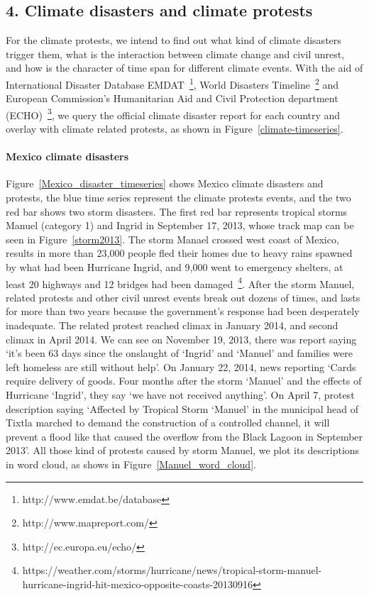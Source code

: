 \documentclass[9pt,twocolumn,twoside]{pnas-new}
\begin{document}
\subsection{4. Climate disasters and climate protests}
For the climate protests, we intend to find out what kind of climate disasters trigger them, what is the interaction between climate change and civil unrest, and how is the character of time span for different climate events. With the aid of International Disaster Database EMDAT~\footnote{http://www.emdat.be/database}, World Disasters Timeline~\footnote{http://www.mapreport.com/} and European Commission's Humanitarian Aid and Civil Protection department (ECHO)~\footnote{http://ec.europa.eu/echo/}, we query the official climate disaster report for each country and overlay with climate related protests, as shown in Figure~\ref{climate-timeseries}.


\paragraph{Mexico climate disasters}
Figure~\ref{Mexico_disaster_timeseries} shows Mexico climate disasters and protests, the blue time series represent the climate protests events, and the two red bar shows two storm disasters. The first red bar represents tropical storms Manuel (category 1) and Ingrid in September 17, 2013, whose track map can be seen in Figure~\ref{storm2013}. The storm Manael crossed west coast of Mexico, results in more than 23,000 people fled their homes due to heavy rains spawned by what had been Hurricane Ingrid, and 9,000 went to emergency shelters, at least 20 highways and 12 bridges had been damaged~\footnote{https://weather.com/storms/hurricane/news/tropical-storm-manuel-hurricane-ingrid-hit-mexico-opposite-coasts-20130916}.
After the storm Manuel, related protests and other civil unrest events break out dozens of times, and lasts for more than two years because the government's response had been desperately inadequate. The related protest reached climax in January 2014, and second climax in April 2014. We can see on November 19, 2013, there was report saying `it's been 63 days since the onslaught of `Ingrid' and `Manuel' and families were left homeless are still without help'. On January 22, 2014, news reporting `Cards require delivery of goods. Four months after the storm `Manuel' and the effects of Hurricane `Ingrid', they say `we have not received anything'. On April 7, protest description saying `Affected by Tropical Storm `Manuel' in the municipal head of Tixtla marched to demand the construction of a controlled channel, it will prevent a flood like that caused the overflow from the Black Lagoon in September 2013'. All those kind of protests caused by storm Manuel, we plot its descriptions in word cloud, as shows in Figure~\ref{Manuel_word_cloud}.
\end{document}
